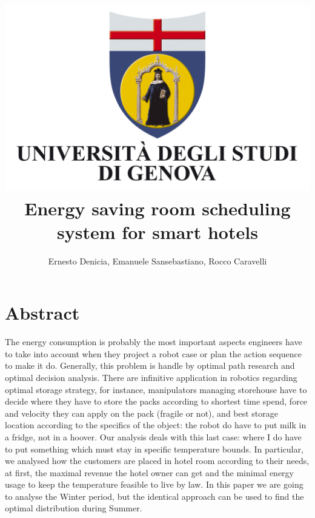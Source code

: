 \documentclass[letterpaper, 10 pt, conference]{ieeeconf}
\title{\includegraphics[scale = 0.05]{img/logo_unige.jpeg} \\ Energy saving room scheduling system for smart hotels}
\author{Ernesto Denicia, Emanuele Sansebastiano, Rocco Caravelli}
\begin{document}
		
%	
%

\maketitle

\small

\section{Abstract}
The energy consumption is probably the most important aspects engineers have to take into account when they project a robot case or plan the action sequence to make it do. Generally, this problem is handle by optimal path research and optimal decision analysis. There are infinitive application in robotics regarding optimal storage strategy, for instance, manipulators managing storehouse have to decide where they have to store the packs according to shortest time spend, force and velocity they can apply on the pack (fragile or not), and best storage location according to the specifics of the object: the robot do have to put milk in a fridge, not in a hoover. Our analysis deals with this last case: where I do have to put something which must stay in specific temperature bounds. In particular, we analysed how the customers are placed in hotel room according to their needs, at first, the maximal revenue the hotel owner can get and the minimal energy usage to keep the temperature feasible to live by law. In this paper we are going to analyse the Winter period, but the identical approach can be used to find the optimal distribution during Summer.
\end{document}
